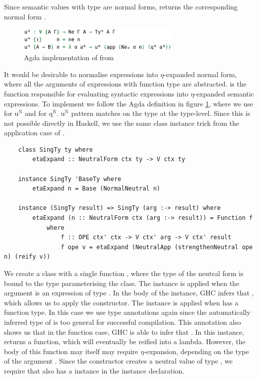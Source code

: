 Since semantic values with type  are normal forms,  returns the corresponding normal form .

\begin{figure}[h]
    \centering
    \includegraphics[width=0.7\textwidth]{./images/agda_eta_expand.png}
    \caption{Agda implementation of  from \cite{AgdaNbe}}
    \label{fig:agdaEtaExpand}
\end{figure}

It would be desirable to normalise expressions into $\eta$-expanded normal form, where all the arguments of expressions with function type are abstracted.  is the function responsible for evaluating syntactic expressions into $\eta$-expanded semantic expressions. To implement  we follow the Agda definition in figure \ref{fig:agdaEtaExpand}, where we use  for $\text{u}^\text{N}$ and  for $\text{q}^\text{N}$. $\text{u}^\text{N}$ pattern matches on the type  at the type-level. Since this is not possible directly in Haskell, we use the same class instance trick from the application case of . 

\begin{lstlisting}
    class SingTy ty where
        etaExpand :: NeutralForm ctx ty -> V ctx ty

    instance SingTy 'BaseTy where
        etaExpand n = Base (NormalNeutral n)

    instance (SingTy result) => SingTy (arg :-> result) where
        etaExpand (n :: NeutralForm ctx (arg :-> result)) = Function f 
            where
                f :: OPE ctx' ctx -> V ctx' arg -> V ctx' result
                f ope v = etaExpand (NeutralApp (strengthenNeutral ope n) (reify v))  
\end{lstlisting}

We create a class  with a single function , where the type of the neutral form is bound to the type  parameterising the class. The  instance is applied when the argument  is an expression of type . In the body of the instance, GHC infers that , which allows us to apply the  constructor. The \code{:->} instance is applied when  has a function type. In this case we use type annotations again since the automatically inferred type of  is too general for successful compilation. This annotation also shows us that in the function case, GHC is able to infer that . In this instance,  returns a function, which will eventually be reified into a lambda. However, the body of this function may itself may require $\eta$-expansion, depending on the type  of the argument . Since the  constructor creates a neutral value of type , we require that  also has a  instance in the instance declaration.

